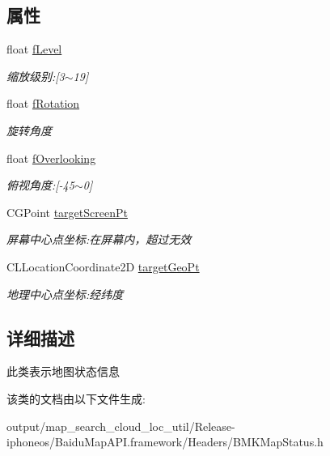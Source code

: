 \subsection*{属性}
\begin{DoxyCompactItemize}
\item 
\hypertarget{interface_b_m_k_map_status_abe3f9d36eee716ca15394aab89e1134c}{}float \hyperlink{interface_b_m_k_map_status_abe3f9d36eee716ca15394aab89e1134c}{f\+Level}\label{interface_b_m_k_map_status_abe3f9d36eee716ca15394aab89e1134c}

\begin{DoxyCompactList}\small\item\em 缩放级别\+:\mbox{[}3$\sim$19\mbox{]} \end{DoxyCompactList}\item 
\hypertarget{interface_b_m_k_map_status_a3c22c82aead710c2dec187ff1d39e370}{}float \hyperlink{interface_b_m_k_map_status_a3c22c82aead710c2dec187ff1d39e370}{f\+Rotation}\label{interface_b_m_k_map_status_a3c22c82aead710c2dec187ff1d39e370}

\begin{DoxyCompactList}\small\item\em 旋转角度 \end{DoxyCompactList}\item 
\hypertarget{interface_b_m_k_map_status_abd88f1cfbe5a8bbf2503c51802bf5c96}{}float \hyperlink{interface_b_m_k_map_status_abd88f1cfbe5a8bbf2503c51802bf5c96}{f\+Overlooking}\label{interface_b_m_k_map_status_abd88f1cfbe5a8bbf2503c51802bf5c96}

\begin{DoxyCompactList}\small\item\em 俯视角度\+:\mbox{[}-\/45$\sim$0\mbox{]} \end{DoxyCompactList}\item 
\hypertarget{interface_b_m_k_map_status_a902555f3b28504a2217443c496edc491}{}C\+G\+Point \hyperlink{interface_b_m_k_map_status_a902555f3b28504a2217443c496edc491}{target\+Screen\+Pt}\label{interface_b_m_k_map_status_a902555f3b28504a2217443c496edc491}

\begin{DoxyCompactList}\small\item\em 屏幕中心点坐标\+:在屏幕内，超过无效 \end{DoxyCompactList}\item 
\hypertarget{interface_b_m_k_map_status_a98d10950c91d08dce079020baafbe10d}{}C\+L\+Location\+Coordinate2\+D \hyperlink{interface_b_m_k_map_status_a98d10950c91d08dce079020baafbe10d}{target\+Geo\+Pt}\label{interface_b_m_k_map_status_a98d10950c91d08dce079020baafbe10d}

\begin{DoxyCompactList}\small\item\em 地理中心点坐标\+:经纬度 \end{DoxyCompactList}\end{DoxyCompactItemize}


\subsection{详细描述}
此类表示地图状态信息 

该类的文档由以下文件生成\+:\begin{DoxyCompactItemize}
\item 
output/map\+\_\+search\+\_\+cloud\+\_\+loc\+\_\+util/\+Release-\/iphoneos/\+Baidu\+Map\+A\+P\+I.\+framework/\+Headers/B\+M\+K\+Map\+Status.\+h\end{DoxyCompactItemize}

